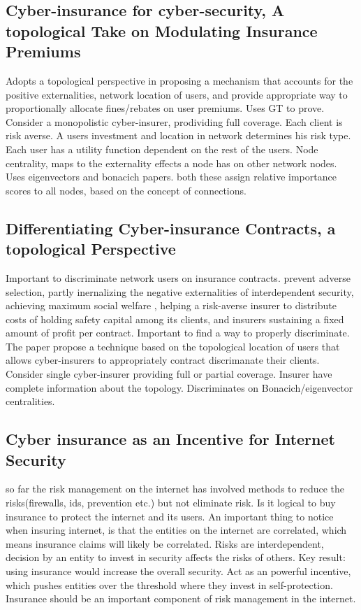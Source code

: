 \subsection{Cyber-insurance for cyber-security, A topological Take on Modulating Insurance Premiums}
\cite{pal2012cyberinsurance}
Adopts a topological perspective in proposing a mechanism that accounts for the positive
 externalities, network location of users, and provide appropriate way to proportionally allocate
  fines/rebates on user premiums. Uses GT to prove. Consider a monopolistic cyber-insurer, prodividing
   full coverage. Each client is risk averse. A users investment and location in network determines
    his risk type. Each user has a utility function dependent on the rest of the users. 
    Node centrality, maps to the externality effects a node has on other network nodes. Uses
    eigenvectors and bonacich papers. both these assign relative importance scores to all nodes, based on the concept of connections.  


\subsection{Differentiating Cyber-insurance Contracts, a topological Perspective}

\cite{paldifferentiating}
Important to discriminate network users on insurance contracts. prevent adverse selection, partly
 inernalizing the negative externalities of interdependent security, achieving maximum social welfare
 , helping a risk-averse insurer to distribute costs of holding safety capital among its clients, and
  insurers sustaining a fixed amount of profit per contract.
Important to find a way to properly discriminate.
The paper propose a technique based on the topological location of users that allows cyber-insurers to
 appropriately contract discrimanate their clients. Consider single cyber-insurer providing full or
  partial coverage. Insurer have complete information about the topology.
  Discriminates on Bonacich/eigenvector centralities.




\subsection{Cyber insurance as an Incentive for Internet Security}
\cite{bolot2008cyber}
so far the risk management on the internet has involved methods to reduce the
risks(firewalls, ids, prevention etc.) but not eliminate risk. Is it logical to buy
insurance to protect the internet and its users.
An important thing to notice when insuring internet, 
is that the entities on the internet are correlated, 
which means insurance claims will likely be correlated. Risks are interdependent, 
decision by an entity to invest in security affects the risks of others.
Key result: using insurance would increase the overall security. 
Act as an powerful incentive, which pushes entities over the threshold where they invest in self-protection.
 Insurance should be an important component of risk management in the internet.

